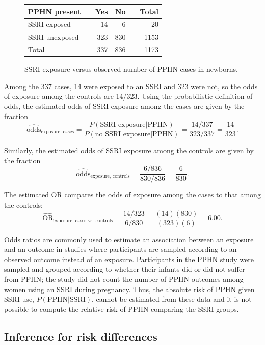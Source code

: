 \begin{figure}[h]
	\centering
	\begin{tabular}{ll rrr r}
		\hline
		PPHN present	 & \hspace{2mm} & Yes & No & \hspace{2mm} & Total \\
		\hline
		SSRI exposed &	& 14 & 6 &  & 20  \\
		SSRI unexposed & & 323 & 830 &  & 1153  \\
        Total & & 337 & 836 & & 1173 \\
		\hline
	\end{tabular}
	\caption{SSRI exposure versus observed number of PPHN cases in newborns.}
    \label{ssriPPHNObservedRepeated}
\end{figure}	

Among the 337 cases, 14 were exposed to an SSRI and 323 were not, so the odds of exposure among the controls are 14/323.  Using the probabilistic definition of odds, the estimated odds of SSRI exposure among the cases are given by the fraction
\[
  \widehat{\text{odds}}_\text{exposure, cases} = \frac{P(\text{SSRI exposure} | \text{PPHN})}
  {P(\text{no SSRI exposure} | \text{PPHN})} = \frac{14/337}{323/337} = \frac{14}{323}.
\]

Similarly, the estimated odds of SSRI exposure among the controls are given by the fraction
\[
  \widehat{\text{odds}}_\text{exposure, controls}= \frac{6/836}{830/836} = \frac{6}{830}.
\]

The estimated OR compares the odds of exposure among the cases to that among the controls: 
\[\widehat{\text{OR}}_{\text{exposure, cases vs. controls}} =  \frac{14/323}{6/830} = \frac{(14)(830)}{(323)(6)} =  6.00. \]

Odds ratios are commonly used to estimate an association between an exposure and an outcome in studies where participants are sampled according to an observed outcome instead of an exposure. Participants in the PPHN study were sampled and grouped according to whether their infants did or did not suffer from PPHN; the study did not count the number of PPHN outcomes among women using an SSRI during pregnancy. Thus, the absolute risk of PPHN given SSRI use, $P(\text{PPHN} | \text{SSRI})$, cannot be estimated from these data and it is not possible to compute the relative risk of PPHN comparing the SSRI groups.


\subsection{Inference for risk differences}
\label{inferenceRiskDifference}


